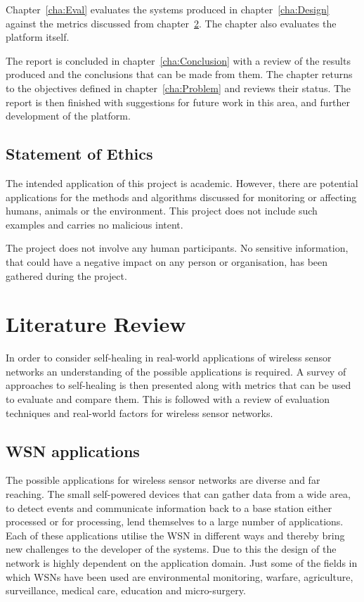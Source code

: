 \documentclass[authoryearcitations]{UoYCSproject}
\begin{document}
Chapter~\ref{cha:Eval} evaluates the systems produced in chapter~\ref{cha:Design} against the metrics discussed from chapter~\ref{cha:LitReview}. The chapter also evaluates the platform itself.

The report is concluded in chapter~\ref{cha:Conclusion} with a review of the results produced and the conclusions that can be made from them. The chapter returns to the objectives defined in chapter~\ref{cha:Problem} and reviews their status. The report is then finished with suggestions for future work in this area, and further development of the platform.

\section{Statement of Ethics}

The intended application of this project is academic. However, there are potential applications for the methods and algorithms discussed for monitoring or affecting humans, animals or the environment. This project does not include such examples and carries no malicious intent.

The project does not involve any human participants. No sensitive information, that could have a negative impact on any person or organisation, has been gathered during the project.

\chapter{Literature Review}
\label{cha:LitReview}


In order to consider self-healing in real-world applications of wireless sensor networks an understanding of the possible applications is required. A survey of approaches to self-healing is then presented along with metrics that can be used to evaluate and compare them. This is followed with a review of evaluation techniques and real-world factors for wireless sensor networks.

\section{WSN applications}


The possible applications for wireless sensor networks are diverse and far reaching. The small self-powered devices that can gather data from a wide area, to detect events and communicate information back to a base station either processed or for processing, lend themselves to a large number of applications. Each of these applications utilise the WSN in different ways and thereby bring new challenges to the developer of the systems. Due to this the design of the network is highly dependent on the application domain. Just some of the fields in which WSNs have been used are environmental monitoring, warfare, agriculture, surveillance, medical care, education and micro-surgery.
\end{document}
